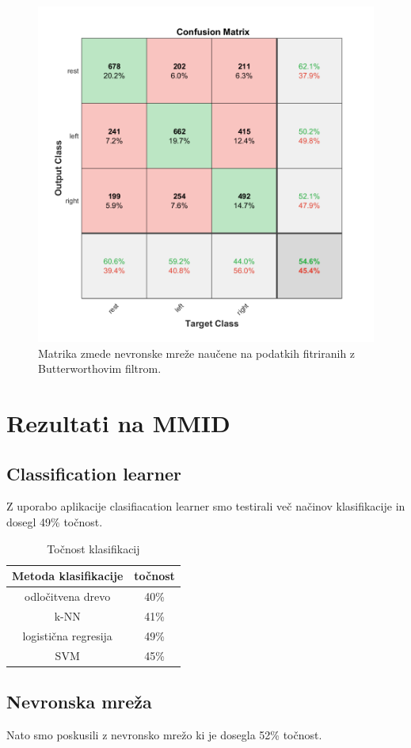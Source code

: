     \begin{figure}[h!]
    \begin{center}
    \includegraphics[width=0.5\linewidth]{slike/Confusion_my.png}
    \end{center}
    \caption{Matrika zmede nevronske mreže naučene na podatkih fitriranih z Butterworthovim filtrom.}
    \end{figure}



\section{Rezultati na MMID}
\subsection{Classification learner}
Z uporabo aplikacije clasifiacation learner smo testirali več načinov klasifikacije in dosegl 49\% točnost. 
\begin{table}[h]
\centering
\begin{tabular}{|c|c|}
\hline
Metoda klasifikacije & točnost \\
\hline
odločitvena drevo & 40\%  \\
\hline
k-NN & 41\% \\
\hline
logistična regresija & 49\% \\
\hline
SVM & 45\% \\
\hline
\end{tabular}
\caption{Točnost klasifikacij}
\end{table}

\subsection{Nevronska mreža}
Nato smo poskusili z nevronsko mrežo ki je dosegla 52\% točnost.

